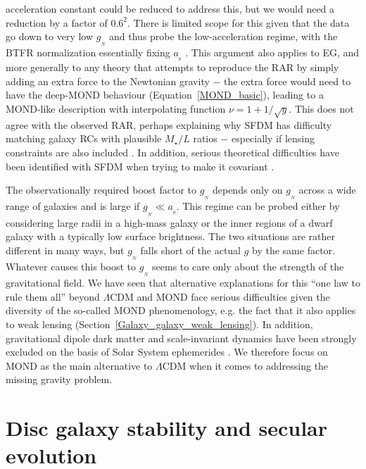 \documentclass[fleqn,usenatbib,useAMS]{mnras} %
\begin{document}
acceleration constant could be reduced to address this, but we would need a reduction by a factor of $0.6^2$. There is limited scope for this given that the data go down to very low $g_{_N}$ and thus probe the low-acceleration regime, with the BTFR normalization essentially fixing $a_{_0}$ \citep[e.g.][]{Lelli_2019}. This argument also applies to EG, and more generally to any theory that attempts to reproduce the RAR by simply adding an extra force to the Newtonian gravity $-$ the extra force would need to have the deep-MOND behaviour (Equation~\ref{MOND_basic}), leading to a MOND-like description with interpolating function $\nu = 1 + 1/\sqrt{y}$. This does not agree with the observed RAR, perhaps explaining why SFDM has difficulty matching galaxy RCs with plausible $M_{\star}/L$ ratios $-$ especially if lensing constraints are also included \citep*{Mistele_2022}. In addition, serious theoretical difficulties have been identified with SFDM when trying to make it covariant \citep{Hertzberg_2021}.

The observationally required boost factor to $g_{_N}$ depends only on $g_{_N}$ across a wide range of galaxies and is large if $g_{_N} \ll a_{_0}$. This regime can be probed either by considering large radii in a high-mass galaxy or the inner regions of a dwarf galaxy with a typically low surface brightness. The two situations are rather different in many ways, but $g_{_N}$ falls short of the actual $g$ by the same factor. Whatever causes this boost to $g_{_N}$ seems to care only about the strength of the gravitational field. We have seen that alternative explanations for this ``one law to rule them all'' \citep{Lelli_2017} beyond $\Lambda$CDM and MOND face serious difficulties given the diversity of the so-called MOND phenomenology, e.g. the fact that it also applies to weak lensing (Section~\ref{Galaxy_galaxy_weak_lensing}). In addition, gravitational dipole dark matter \citep{Hajdukovic_2020} and scale-invariant dynamics \citep{Maeder_2020} have been strongly excluded on the basis of Solar System ephemerides \citep{Banik_2020_dipole, Banik_2020_SID}. We therefore focus on MOND as the main alternative to $\Lambda$CDM when it comes to addressing the missing gravity problem.





\section{Disc galaxy stability and secular evolution}
\label{Disc_galaxy_stability_evolution}
\end{document}
